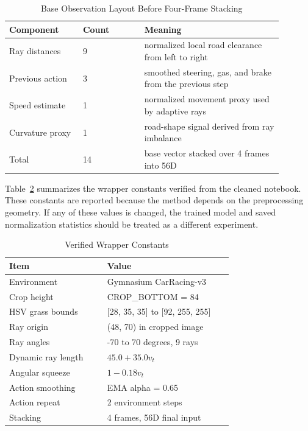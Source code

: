 \documentclass[conference]{IEEEtran}
\begin{document}
\begin{table}[t]
\caption{Base Observation Layout Before Four-Frame Stacking}
\label{tab:features}
\centering
\scriptsize
\begin{tabular}{p{0.24\linewidth}p{0.20\linewidth}p{0.45\linewidth}}
\toprule
Component & Count & Meaning \\
\midrule
Ray distances & 9 & normalized local road clearance from left to right \\
Previous action & 3 & smoothed steering, gas, and brake from the previous step \\
Speed estimate & 1 & normalized movement proxy used by adaptive rays \\
Curvature proxy & 1 & road-shape signal derived from ray imbalance \\
\midrule
Total & 14 & base vector stacked over 4 frames into 56D \\
\bottomrule
\end{tabular}
\end{table}

Table~\ref{tab:wrapper} summarizes the wrapper constants verified from the cleaned notebook. These constants are reported because the method depends on the preprocessing geometry. If any of these values is changed, the trained model and saved normalization statistics should be treated as a different experiment.

\begin{table}[t]
\caption{Verified Wrapper Constants}
\label{tab:wrapper}
\centering
\scriptsize
\begin{tabular}{p{0.39\linewidth}p{0.50\linewidth}}
\toprule
Item & Value \\
\midrule
Environment & Gymnasium CarRacing-v3 \\
Crop height & CROP\_BOTTOM = 84 \\
HSV grass bounds & [28, 35, 35] to [92, 255, 255] \\
Ray origin & (48, 70) in cropped image \\
Ray angles & -70 to 70 degrees, 9 rays \\
Dynamic ray length & $45.0 + 35.0v_t$ \\
Angular squeeze & $1 - 0.18v_t$ \\
Action smoothing & EMA alpha = 0.65 \\
Action repeat & 2 environment steps \\
Stacking & 4 frames, 56D final input \\
\bottomrule
\end{tabular}
\end{table}
\end{document}
